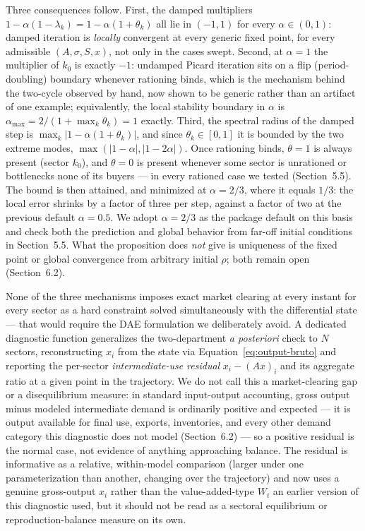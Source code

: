 \documentclass[11pt]{article}
\begin{document}
Three consequences follow. First, the damped multipliers
$1-\alpha(1-\lambda_k)=1-\alpha(1+\theta_k)$ all lie in $(-1,1)$ for
every $\alpha\in(0,1)$: damped iteration is \emph{locally} convergent
at every generic fixed point, for every admissible $(A,\sigma,S,x)$, not
only in the cases swept. Second, at $\alpha=1$ the multiplier of $k_0$
is exactly $-1$: undamped Picard iteration sits on a flip
(period-doubling) boundary whenever rationing binds, which is the
mechanism behind the two-cycle observed by hand, now shown to be
generic rather than an artifact of one example; equivalently, the
local stability boundary in $\alpha$ is $\alpha_{\max}=2/(1+\max_k\theta_k)=1$
exactly. Third, the spectral radius of the damped step is
$\max_k|1-\alpha(1+\theta_k)|$, and since $\theta_k\in[0,1]$ it is
bounded by the two extreme modes, $\max(|1-\alpha|,|1-2\alpha|)$. Once
rationing binds, $\theta=1$ is always present (sector $k_0$), and
$\theta=0$ is present whenever some sector is unrationed or bottlenecks
none of its buyers --- in every rationed case we tested
(Section~5.5). The bound is then attained, and minimized at $\alpha=2/3$,
where it equals $1/3$: the local error shrinks by a factor of three per
step, against a factor of two at the previous default $\alpha=0.5$. We
adopt $\alpha=2/3$ as the package default on this basis and check both
the prediction and global behavior from far-off initial conditions in
Section~5.5. What the proposition does
\emph{not} give is uniqueness of the fixed point or global convergence
from arbitrary initial $\rho$; both remain open (Section~6.2).

None of the three mechanisms imposes exact market clearing at every
instant for every sector as a hard constraint solved simultaneously with
the differential state --- that would require the DAE formulation we
deliberately avoid. A dedicated diagnostic function generalizes the
two-department \emph{a posteriori} check to $N$ sectors, reconstructing
$x_i$ from the state via Equation~\eqref{eq:output-bruto} and reporting
the per-sector \emph{intermediate-use residual} $x_i - (Ax)_i$ and its
aggregate ratio at a given point in the trajectory. We do not call this
a market-clearing gap or a disequilibrium measure: in standard
input-output accounting, gross output minus modeled intermediate demand
is ordinarily positive and expected --- it is output available for
final use, exports, inventories, and every other demand category this
diagnostic does not model (Section~6.2) --- so a positive residual is
the normal case, not evidence of anything approaching balance. The
residual is informative as a relative, within-model comparison (larger
under one parameterization than another, changing over the trajectory)
and now uses a genuine gross-output $x_i$ rather than the
value-added-type $W_i$ an earlier version of this diagnostic used, but
it should not be read as a sectoral equilibrium or reproduction-balance
measure on its own.
\end{document}
